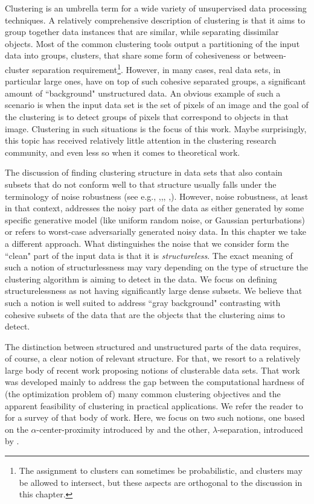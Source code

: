 \documentclass[12pt]{article}
\begin{document}
\fi

Clustering is an umbrella term for a wide variety of unsupervised data processing techniques. A relatively comprehensive description of clustering is  that it aims to group together data instances that are similar, while separating dissimilar objects. Most of the common clustering tools output a partitioning of the input data into groups, clusters, that share some form of cohesiveness or between-cluster separation requirement\footnote{The assignment to clusters can sometimes be probabilistic, and clusters may be allowed to intersect, but these aspects are orthogonal to the discussion in this chapter.}. However, in many cases, real data sets, in particular large ones, have on top of such cohesive separated groups, a significant amount of ``background" unstructured data. An obvious example of such a scenario is when the input data set is the set of pixels of an image and the goal of the clustering is to detect groups of pixels that correspond to objects in that image. Clustering in such situations is the focus of this work. Maybe surprisingly, this topic has received relatively little attention in the clustering research community, and even less so when it comes to theoretical work. 

The discussion of finding clustering structure in data sets that also contain subsets that do not conform well to that structure usually falls under the terminology of noise robustness (see e.g., \cite{balcan2012clustering},\cite{ackerman2009clusterability},\cite{dave1993robust}, \cite{cuesta1997trimmed},\cite{garcia2008general}). However, noise robustness, at least in that context, addresses the noisy part of the data as either generated by some specific generative model (like uniform random noise, or Gaussian perturbations) or refers to worst-case adversarially generated noisy data. In this chapter we take a different approach. What distinguishes the noise that we consider form the ``clean" part of the input data is that it is \emph{structureless}. The exact meaning of such a notion of structurlessness may vary depending on the type of structure the clustering algorithm is aiming to detect in the data. We focus on defining structurelessness as  not having significantly large dense subsets. We believe that such a notion is well suited to address ``gray background" contrasting with cohesive subsets of the data that are the objects that the clustering aims to detect. 

The distinction between structured and unstructured parts of the data requires, of course, a clear notion of relevant structure. For that, we resort to a relatively large body of recent work proposing notions of clusterable data sets. That work was developed mainly to address the gap between the computational hardness of (the optimization problem of) many common clustering objectives and the apparent feasibility of clustering in practical applications. We refer the reader to \cite{ben2015computational} for a survey of that body of work. Here, we focus on two such notions, one based on the $\alpha$-center-proximity introduced by \cite{awasthi2012center} and the other, $\lambda$-separation, introduced by \cite{ben2014clustering}.
\end{document}
